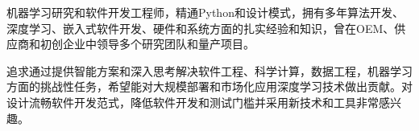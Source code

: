 \documentclass[../resume_cn.tex]{subfiles}
\begin{document}


\begin{cvparagraph}

机器学习研究和软件开发工程师，精通Python和设计模式，拥有多年算法开发、深度学习、嵌入式软件开发、硬件和系统方面的扎实经验和知识，曾在OEM、供应商和初创企业中领导多个研究团队和量产项目。

追求通过提供智能方案和深入思考解决软件工程、科学计算，数据工程，机器学习方面的挑战性任务，希望能对大规模部署和市场化应用深度学习技术做出贡献。对设计流畅软件开发范式，降低软件开发和测试门槛并采用新技术和工具非常感兴趣。

\end{cvparagraph}
\end{document}
